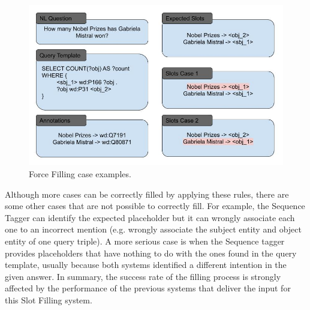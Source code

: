 \begin{figure}[!h]
    \centering
    \includegraphics[scale=.55]{imagenes/3_system_overview/slotFillingExample.png}
    \caption{Force Filling case examples.}
    \label{fig:forceFillingExample}
\end{figure}

Although more cases can be correctly filled by applying these rules, there are some other 
cases that are not possible to correctly fill. For example, the Sequence Tagger can identify 
the expected placeholder but it can wrongly associate each one to an incorrect mention (e.g. 
wrongly associate the subject entity and object entity of one query triple). A more serious 
case is when the Sequence tagger provides placeholders that have nothing to do with the ones 
found in the query template, usually because both systems identified a different intention in 
the given answer. In summary, the success rate of the filling process is strongly affected by 
the performance of the previous systems that deliver the input for this Slot Filling system.
